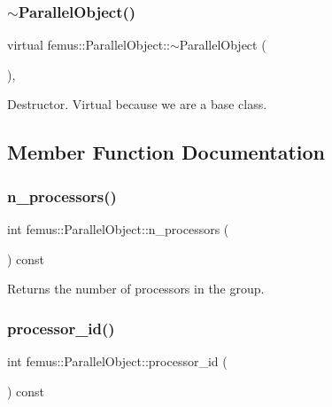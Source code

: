 \subsubsection{\texorpdfstring{$\sim$\+Parallel\+Object()}{~ParallelObject()}}
{\footnotesize\ttfamily virtual femus\+::\+Parallel\+Object\+::$\sim$\+Parallel\+Object (\begin{DoxyParamCaption}{ }\end{DoxyParamCaption})\hspace{0.3cm}{\ttfamily [inline]}, {\ttfamily [virtual]}}

Destructor. Virtual because we are a base class. 

\subsection{Member Function Documentation}
\mbox{\label{classfemus_1_1_parallel_object_af6629fca51be192be664c76eb8aecc79}} 
\subsubsection{\texorpdfstring{n\+\_\+processors()}{n\_processors()}}
{\footnotesize\ttfamily int femus\+::\+Parallel\+Object\+::n\+\_\+processors (\begin{DoxyParamCaption}{ }\end{DoxyParamCaption}) const\hspace{0.3cm}{\ttfamily [inline]}}

\begin{DoxyReturn}{Returns}
the number of processors in the group. 
\end{DoxyReturn}
\mbox{\label{classfemus_1_1_parallel_object_a6438b3ffcc8cde2d6ccfb4ec563dfce1}} 
\subsubsection{\texorpdfstring{processor\+\_\+id()}{processor\_id()}}
{\footnotesize\ttfamily int femus\+::\+Parallel\+Object\+::processor\+\_\+id (\begin{DoxyParamCaption}{ }\end{DoxyParamCaption}) const\hspace{0.3cm}{\ttfamily [inline]}}

